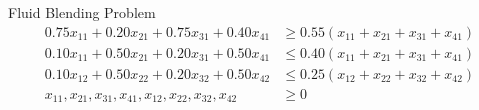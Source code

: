 \begin{frameExample}{Fluid Blending Problem}{}
{  \begin{align*}
    0.75x_{11} + 0.20x_{21} + 0.75x_{31} + 0.40x_{41} & \geq 0.55(x_{11} + x_{21} + x_{31} + x_{41} ) \\
    0.10x_{11} + 0.50x_{21} + 0.20x_{31} + 0.50x_{41} & \leq 0.40(x_{11} + x_{21} + x_{31} + x_{41} ) \\
    0.10x_{12} + 0.50x_{22} + 0.20x_{32} + 0.50x_{42} & \leq 0.25(x_{12} + x_{22} + x_{32} + x_{42} ) \\[5mm]
    x_{11} , x_{21} , x_{31},x_{41}, x_{12} , x_{22} , x_{32},x_{42} & \geq 0
  \end{align*}
}
\end{frameExample}


